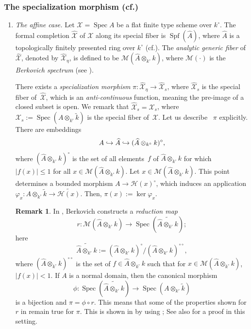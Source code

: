\documentclass[10pt]{amsart}
\newcommand{\cf}{cf.}
\let\Subsubsection\subsubsection
\newcommand{\hto}{\mathrel{\lhook\joinrel\to}}
\DeclareMathOperator{\Spec}{Spec}
\DeclareMathOperator{\Spf}{Spf}
\theoremstyle{definition}
\newtheorem{rem}[thm]{Remark}
\begin{document}
\Subsubsection{The specialization morphism (\cf \cite[\S 1]{ber})} \label{spec}

\begin{enumerate}
\item\label{para}
\emph{The affine case.}
Let $\mathscr{X}=\Spec A$ be a flat finite type scheme over $k^{\circ}$. The formal completion $\widehat{\mathscr{X}}$ of $\mathscr{X}$ along its special fiber is $\Spf(\widehat{A})$, where $\widehat{A}$ is a topologically finitely presented ring over $k^{\circ}$ (\cf \cite[p.\,541]{ber}). The \textit{analytic generic fiber} of $\widehat{\mathscr{X}}$, denoted by $\widehat{\mathscr{X}}_{\eta}$, is defined to be ${\mathcal{M}(\widehat{A} \otimes_{k^{\circ}} k)}$, where $\mathcal{M}(\cdot)$ is the \textit{Berkovich spectrum} (see \hbox{\cite[1.2]{Ber90}}).

There exists a \textit{specialization morphism} $\pi: \widehat{\mathscr{X}}_{\eta} \to \widehat{\mathscr{X}}_s$, where $\widehat{\mathscr{X}}_s$ is the special fiber of~$\widehat{\mathscr{X}}$, which is an \emph{anti-continuous} function, meaning the pre-image of a closed subset is open. We remark that $\widehat{\mathscr{X}}_s=\mathscr{X}_s$, where $\mathscr{X}_s:=\Spec(A \otimes_{k^{\circ}} \widetilde{k})$ is the special fiber of~$\mathscr{X}$. Let us describe ~$\pi$ explicitly. There are embeddings\vspace*{-3pt}
\[
A \hto \widehat{A} \hto (\widehat{A} \otimes_{k^{\circ}} k)^{\circ},
\]
where $(\widehat{A} \otimes_{k^{\circ}} k)^{\circ}$ is the set of all elements~$f$ of $\widehat{A} \otimes_{k^{\circ}} k$ for which $|f(x)| \leqslant 1$ for all $x \!\in\! \mathcal{M}(\widehat{A} \otimes_{k^{\circ}} k)$. Let $x \!\in\! \mathcal{M}(\widehat{A} \otimes_{k^{\circ}} k)$. This point determines a bounded morphism $A \!\to\! \mathcal{H}(x)^{\circ}$, which induces an application ${\varphi_x : A \otimes_{k^{\circ}} \widetilde{k} \to \widetilde{\mathcal{H}(x)}}$. Then, $\pi(x):=\ker{\varphi_x}$.

\begin{rem} \label{berred}
In \cite[2.4]{Ber90}, Berkovich constructs a \emph{reduction map}
\[
r : \mathcal{M}(\widehat{A} \otimes_{k^{\circ}} k) \to \Spec(\widetilde{\widehat{A} \otimes_{k^{\circ}} k});
\]
here
\[
\widetilde{\widehat{A} \otimes_{k^{\circ}} k}:=(\widehat{A} \otimes_{k^{\circ}} k)^{\circ}/(\widehat{A} \otimes_{k^{\circ}} k)^{\circ\circ},
\]
where $(\widehat{A} \otimes_{k^{\circ}} k)^{\circ\circ}$ is the set of $f \in \widehat{A} \otimes_{k^{\circ}} k$ such that for $x \in \mathcal{M}(\widehat{A} \otimes_{k^{\circ}} k)$, $|f(x)|<1$. If $A$ is a normal domain, then the canonical morphism
\[
\phi: \Spec(\widetilde{\widehat{A} \otimes_{k^{\circ}} k}) \to \Spec(A \otimes_{k^{\circ}} \widetilde{k})
\]
is a bijection and $\pi=\phi \circ r$. This means that some of the properties shown for $r$ in \cite[2.4]{Ber90} remain true for $\pi$. This is shown in \cite[Rem.\,4.8]{mart} by using \cite[Th.\,2.1]{mart}; See also \cite[Prop.\,4.1]{une} for a proof in this setting.
\end{rem}


\end{enumerate}
\end{document}
